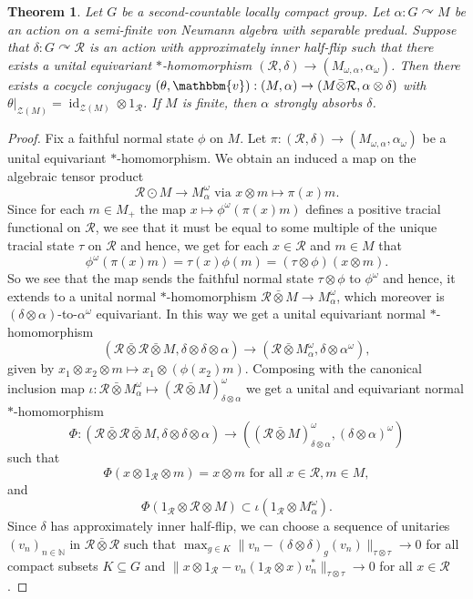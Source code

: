 \documentclass[11pt,a4paper]{article}
\newtheorem{theorem}{Theorem}
\theoremstyle{definition}
\theoremstyle{remark}
\numberwithin{equation}{section}
\numberwithin{theorem}{section}
\newcommand{\N}{\mathbb{N}}
\newcommand{\acts}{\curvearrowright}
\begin{document}
\begin{theorem} \label{theorem:sufficient_criterium_strong_absorption}
Let $G$ be a second-countable locally compact group.
Let $\alpha\colon G \acts M$ be an action on a semi-finite von Neumann algebra with separable predual.
Suppose that $\delta\colon G \acts \mathcal{R}$ is an action with approximately inner half-flip such that there exists a unital equivariant $*$-homomorphism $(\mathcal{R}, \delta) \rightarrow (M_{\omega,\alpha}, \alpha_\omega)$.
Then there exists a cocycle conjugacy $(\theta,\mathbbm{v}): (M,\alpha) \to (M\bar{\otimes}\mathcal{R},\alpha \otimes \delta)$ with $\theta|_{\mathcal{Z}(M)}=\operatorname{id}_{\mathcal{Z}(M)}\otimes 1_{\mathcal R}$.
If $M$ is finite, then $\alpha$ strongly absorbs $\delta$.
\end{theorem}
\begin{proof}
Fix a faithful normal state $\phi$ on $M$.
Let $\pi\colon (\mathcal{R},\delta) \rightarrow (M_{\omega,\alpha},\alpha_{\omega})$ be a unital equivariant $*$-homomorphism.
We obtain an induced a map on the algebraic tensor product
\[
\mathcal{R} \odot M \rightarrow M^\omega_\alpha \text{ via } x \otimes m \mapsto \pi(x) m.
\]
Since for each $m \in M_+$ the map $x \mapsto \phi^\omega(\pi(x)m)$ defines a positive tracial functional on $\mathcal{R}$,
 we see that it must be equal to some multiple of the unique tracial state $\tau$ on $\mathcal{R}$ and hence,
  we get for each $x \in \mathcal{R}$ and $m \in M$ that 
\[\phi^\omega(\pi(x) m) = \tau(x) \phi(m) = (\tau \otimes \phi)(x \otimes m).\]
So we see that the map sends the faithful normal state $\tau \otimes \phi$ to $\phi^\omega$ and hence,
 it extends to a unital normal $*$-homomorphism $\mathcal{R} \bar{\otimes} M \rightarrow M^\omega_\alpha$,
 which moreover is $(\delta \otimes \alpha)$-to-$\alpha^\omega$ equivariant.   
In this way we get a unital equivariant normal $*$-homomorphism
\[(\mathcal{R} \bar{\otimes} \mathcal{R} \bar{\otimes}M, \delta \otimes \delta \otimes \alpha) \rightarrow (\mathcal{R} \bar{\otimes} M^\omega_\alpha, \delta \otimes \alpha^\omega),\]
given by $x_1 \otimes x_2 \otimes m \mapsto x_1 \otimes (\phi(x_2) m)$. 
Composing with the canonical inclusion map $\iota\colon \mathcal{R} \bar{\otimes} M^\omega_\alpha \mapsto (\mathcal{R} \bar{\otimes} M)^\omega_{\delta\otimes\alpha}$ we get a unital and equivariant normal $*$-homomorphism
\[\Phi\colon (\mathcal{R} \bar{\otimes} \mathcal{R} \bar{\otimes} M, \delta \otimes \delta \otimes \alpha) \rightarrow ((\mathcal{R} \bar{\otimes} M)^\omega_{\delta \otimes \alpha}, (\delta \otimes \alpha)^\omega)\]
such that
\[
\Phi(x \otimes 1_\mathcal{R} \otimes m) = x \otimes m \text{ for all } x \in \mathcal{R}, m \in M,
\]
and
\[
\Phi(1_\mathcal{R} \otimes \mathcal{R} \otimes M) \subset \iota(1_\mathcal{R} \otimes M^\omega_\alpha).
\]
Since $\delta$ has approximately inner half-flip,
 we can choose a sequence of unitaries $(v_n)_{n \in \N}$ in $\mathcal{R} \bar{\otimes} \mathcal{R}$ such that 
 $\max_{g \in K}\|v_n - (\delta \otimes \delta)_g(v_n)\|_{\tau \otimes \tau} \rightarrow 0$ for all compact subsets $K \subseteq G$ and 
 ${\|x \otimes 1_\mathcal{R} - v_n (1_\mathcal{R} \otimes x)v_n^*\|_{\tau \otimes \tau}  \rightarrow 0}$ for all $x \in \mathcal{R}$. 
 

\end{proof}
\end{document}
